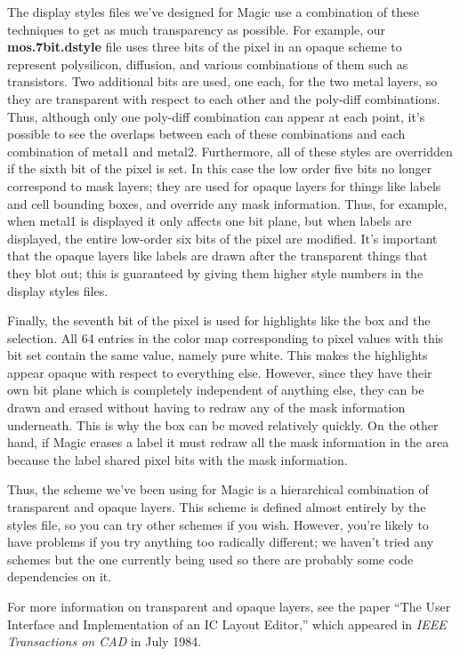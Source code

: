 \documentclass[letterpaper,twoside,12pt]{article}
\begin{document}
The display styles files we've designed for Magic use a combination
of these techniques to get as much transparency as possible.
For example, our {\bfseries mos.7bit.dstyle} file uses three bits
of the pixel in an opaque scheme to represent polysilicon,
diffusion, and various combinations of them such as transistors.
Two additional bits are used, one each, for the two metal layers,
so they are transparent with respect to each other and the
poly-diff combinations.  Thus, although only one poly-diff combination
can appear at each point, it's possible to see the overlaps between
each of these combinations and each combination of metal1 and metal2.
Furthermore, all of these styles are overridden if the
sixth bit of the pixel is set.  In this case the low
order five bits no longer correspond to mask layers;  they are
used for opaque layers for things like labels and cell bounding
boxes, and override any mask information.  Thus, for example,
when metal1 is displayed it only affects one bit plane, but
when labels are displayed, the entire low-order six bits of the
pixel are modified.  It's important that the opaque layers like
labels are drawn after the transparent things that they blot out;
this is guaranteed by giving them higher style numbers in
the display styles files.

Finally, the seventh bit of the pixel is used for
highlights like the box and the selection.  All 64 entries
in the color map corresponding to pixel values with this
bit set contain the same value, namely pure white.  This makes
the highlights appear opaque with respect to everything
else.  However, since they have their own bit plane which
is completely independent of anything else, they can be
drawn and erased without having to redraw any of the mask
information underneath.  This is why the box can be moved
relatively quickly.  On the other hand, if Magic erases
a label it must redraw all the mask information in the area
because the label shared pixel bits with the mask information.

Thus, the scheme we've been using for Magic is a hierarchical
combination of transparent and opaque layers.  This scheme is
defined almost entirely by the styles file, so you can try
other schemes if you wish.  However, you're likely to have problems
if you try anything too radically different;  we haven't tried
any schemes but the one currently being used so there are probably
some code dependencies on it.

For more information on transparent and opaque layers, see
the paper ``The User Interface and Implementation of an IC Layout
Editor,'' which appeared in {\itshape IEEE Transactions on CAD} in
July 1984.
\end{document}
